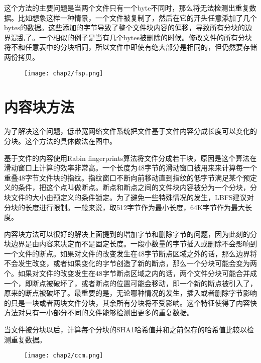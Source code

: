 这个方法的主要问题是当两个文件只有一个byte不同时，那么将无法检测出重复数据。比如想象这样一种情景，一个文件被复制了，然后在它的开头任意添加了几个bytes的数据。这些添加的字节导致了整个文件块内容的偏移，导致所有分块的边界混乱了。一个相似的例子是当有几个bytes被删除的时候。修改文件的所有分块将不和任意表中的分块相同，所以文件中即使有绝大部分是相同的，但仍然要存储两份拷贝。

\begin{figure}[!hbp]
    \begin{minipage}[b]{1\textwidth}
    \captionstyle{\centering}
    \centering
    \texttt{[image: chap2/fsp.png]}
    \end{minipage}     
\end{figure}
\section{内容块方法}
\label{sec:contentchunk}

为了解决这个问题，低带宽网络文件系统把文件基于文件内容分成长度可以变化的分块。这个方法的具体做法在图中。

基于文件的内容使用Rabin fingerprints算法将文件分成若干块，原因是这个算法在滑动窗口上计算的效率非常高。一个长度为48字节的滑动窗口被用来来计算每一个重叠48字节文件块的指纹。指纹窗口不断向前移动直到指纹的低字节满足某个预定义的条件，把这个点叫做断点。断点和断点之间的文件块内容被分为一个分块，分块文件的大小由预定义的条件锁定。为了避免一些特殊情况的发生，LBFS建议对分块的长度进行限制。一般来说，取512字节作为最小长度，64K字节作为最大长度。

内容块方法可以很好的解决上面提到的增加字节和删除字节的问题，因为此刻的分块边界是由内容来决定而不是固定长度。一段小数量的字节插入或删除不会影响到一个文件的断点。如果对文件的改变发生在48字节断点区域之外的话，那么边界将不会发生改变，或者如果变化的字节创造了新的断点，那么一个分块可能会变为两个。如果对文件的改变发生在48字节断点区域之内的话，两个文件分块可能合并成一个，即断点被破坏了，或者断点的位置可能会移动，即一个新的断点被引入了，原来的断点被破坏了。最重要的是，无论哪种情况的发生，插入或者删除字节影响的只是一块或者两块文件分块，其余所有分块将不受影响。这个特征使得了内容快方法对只有一小部分不同的文件能够检测出更多的重复数据。

当文件被分块以后，计算每个分块的SHA1哈希值并和之前保存的哈希值比较以检测重复数据。

\begin{figure}[!hbp]
    \begin{minipage}[b]{1\textwidth}
    \captionstyle{\centering}
    \centering
    \texttt{[image: chap2/ccm.png]}
    \end{minipage}
\end{figure}


